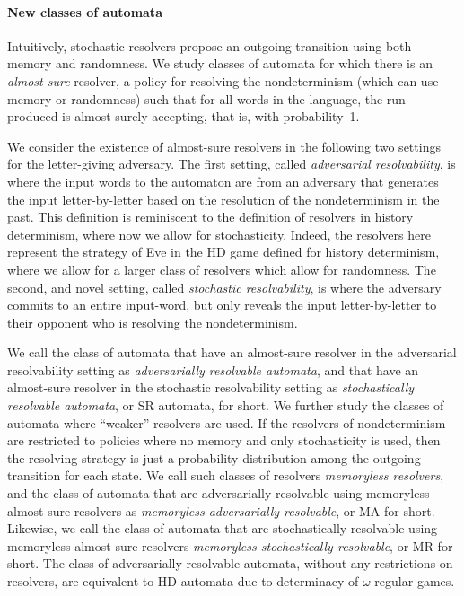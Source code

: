 \paragraph*{New classes of automata} Intuitively, stochastic resolvers propose an outgoing transition using both memory and randomness.
We study classes of automata for which there is an \emph{almost-sure} resolver, a policy for resolving the nondeterminism (which can use memory or randomness) such that for all words in the language, the run produced is almost-surely accepting, that is, with probability~1.%

We consider the existence of almost-sure resolvers in the following two settings for the letter-giving adversary.  The first setting, called \emph{adversarial resolvability}, is where the input words to the automaton are from an adversary that generates the input letter-by-letter based on the resolution of the nondeterminism in the past. This definition is reminiscent to the definition of resolvers in history determinism, where now we allow for stochasticity. Indeed, the resolvers here represent the strategy of Eve in the HD game defined for history determinism, where we allow for a larger class of resolvers which allow for randomness. 
The second, and novel setting, called \emph{stochastic resolvability}, is where the adversary commits to an entire input-word, but only reveals the input letter-by-letter to their opponent who is resolving the nondeterminism. 

 We call the class of automata that have an almost-sure resolver in the adversarial resolvability setting as \emph{adversarially resolvable automata}, and that have an almost-sure resolver in the stochastic resolvability setting as \emph{stochastically resolvable automata}, or SR automata, for short.
We further study the classes of automata where ``weaker'' resolvers are used. If the resolvers of nondeterminism are restricted to policies where no memory and only stochasticity is used, then the resolving strategy is just a probability distribution among the outgoing transition for each state. We call such classes of resolvers \emph{memoryless resolvers}, and the class of automata that are adversarially resolvable using memoryless almost-sure resolvers as \emph{memoryless-adversarially resolvable}, or MA for short. Likewise, we call the class of automata that are stochastically resolvable using memoryless almost-sure resolvers \emph{memoryless-stochastically resolvable}, or MR for short. The class of adversarially resolvable automata, without any restrictions on resolvers, are equivalent to HD automata due to determinacy of $\omega$-regular games.

